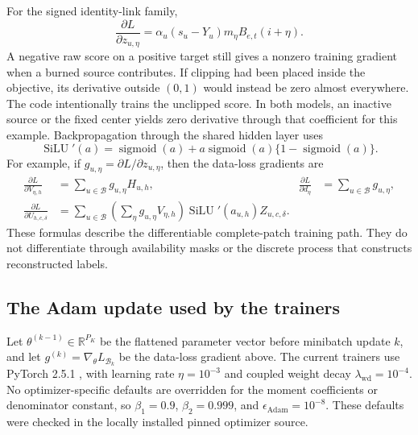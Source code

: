 \documentclass[11pt,a4paper]{article}
\newcommand{\R}{\mathbb{R}}
\begin{document}
For the signed identity-link family,
\begin{equation}
 \frac{\partial L}{\partial z_{u,\eta}}
 =\alpha_u(s_u-Y_u)m_\eta B_{e,t}(i+\eta).
 \label{eq:prob-direct-gradient}
\end{equation}
A negative raw score on a positive target still gives a nonzero training
gradient when a burned source contributes. If clipping had been placed inside
the objective, its derivative outside $(0,1)$ would instead be zero almost
everywhere. The code intentionally trains the unclipped score. In both models,
an inactive source or the fixed center yields zero derivative through that
coefficient for this example. Backpropagation through the shared hidden layer
uses
\begin{equation}
 \operatorname{SiLU}'(a)=\operatorname{sigmoid}(a)
   +a\operatorname{sigmoid}(a)\{1-\operatorname{sigmoid}(a)\}.
\end{equation}
For example, if $g_{u,\eta}=\partial L/\partial z_{u,\eta}$, then the data-loss
gradients are
\begin{align}
 \frac{\partial L}{\partial V_{\eta,h}}
    &=\sum_{u\in\mathcal B}g_{u,\eta}H_{u,h},&
 \frac{\partial L}{\partial d_\eta}
    &=\sum_{u\in\mathcal B}g_{u,\eta},\\
 \frac{\partial L}{\partial U_{h,c,\delta}}
    &=\sum_{u\in\mathcal B}
       \left(\sum_{\eta}g_{u,\eta}V_{\eta,h}\right)
       \operatorname{SiLU}'(a_{u,h})Z_{u,c,\delta}.
\end{align}
These formulas describe the differentiable complete-patch training path.
They do not differentiate through availability masks or the discrete process
that constructs reconstructed labels.

\subsection{The Adam update used by the trainers}
Let $\theta^{(k-1)}\in\R^{P_K}$ be the flattened parameter vector before
minibatch update $k$, and let $g^{(k)}=\nabla_\theta L_{\mathcal B_k}$ be
the data-loss gradient above. The current trainers use PyTorch 2.5.1
, with learning rate $\eta=10^{-3}$ and coupled
weight decay $\lambda_{\mathrm{wd}}=10^{-4}$. No optimizer-specific
defaults are overridden for the moment coefficients or denominator constant,
so $\beta_1=0.9$, $\beta_2=0.999$, and $\epsilon_{\mathrm{Adam}}=10^{-8}$.
These defaults were checked in the locally installed pinned optimizer source.
\end{document}
